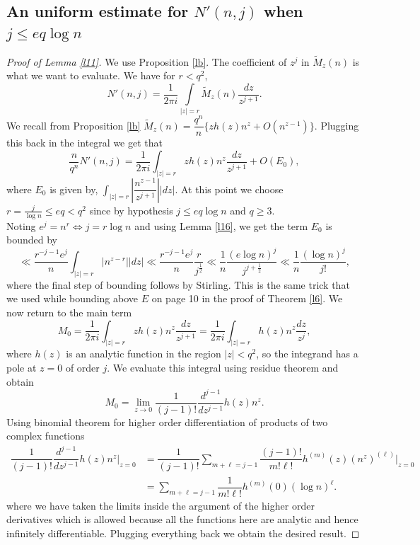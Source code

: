\documentclass[12pt]{amsart}
\numberwithin{equation}{section}
\theoremstyle{remark}
\theoremstyle{remark}
\theoremstyle{definition}
\begin{document}
\subsection{An uniform estimate for $N'(n,j)$ when $j\leqslant eq\log n$}\label{lj}
\s*
\begin{proof}[Proof of Lemma \ref{l11}]\label{X}
We use Proposition \ref{lb}. The coefficient of $z^j$ in $\widetilde{M}_z(n)$ is what we want to evaluate. We have for $r<q^2$,
$$N'(n,j)=\dfrac{1}{2\pi i}\displaystyle\int\limits_{|z|=r} \widetilde{M}_z(n) \dfrac{dz}{z^{j+1}}.$$
We recall from Proposition \ref{lb} $\widetilde{M}_z(n)=\dfrac{q^n}{n}\bigg \{ zh(z)n^z+O\left(n^{z-1}\right)\bigg \}.$
Plugging this back in the integral we get that
$$\dfrac{n}{q^n}N'(n,j)=\dfrac{1}{2\pi i}\displaystyle\int_{|z|=r}zh(z)n^z \dfrac{dz}{z^{j+1}}+O(E_0),$$
where $E_0$ is given by, $\displaystyle\int_{|z|=r} \left|\dfrac{n^{z-1}}{z^{j+1}}\right||dz|.$
At this point we choose $r=\frac{j}{\log n}\leqslant eq < q^2$ since by hypothesis $j\leqslant eq\log n$ and $q\geqslant 3$.\\
Noting $e^j=n^r\iff j=r\log n$ and using Lemma \ref{l16}, we get the term $E_0$ is bounded by
$$\ll \dfrac{r^{-j-1}e^j}{n}\displaystyle\int_{|z|=r} |n^{z-r}||dz|\ll \dfrac{r^{-j-1}e^j}{n}\dfrac{r}{j^{\frac{1}{2}}}\ll \dfrac{1}{n}\dfrac{(e\log n)^j}{j^{j+\frac{1}{2}}}\ll \dfrac{1}{n} \dfrac{(\log n)^j}{j!},$$
where the final step of bounding follows by Stirling.
This is the same trick that we used while bounding above $E$ on page 10 in the proof of Theorem \ref{l6}. 
We now return to the main term
$$M_0=\dfrac{1}{2\pi i}\displaystyle\int_{|z|=r}zh(z)n^z \dfrac{dz}{z^{j+1}}=\dfrac{1}{2\pi i}\displaystyle\int_{|z|=r}h(z)n^z \dfrac{dz}{z^j},$$
where $h(z)$ is an analytic function in the region $|z|<q^2$, so the integrand has a pole at $z=0$ of order $j$. We evaluate this integral using residue theorem and obtain
$$M_0=\lim\limits_{z\to 0}\dfrac{1}{(j-1)!}\dfrac{d^{j-1}}{dz^{j-1}} h(z)n^z.$$
Using binomial theorem for higher order differentiation of products of two complex functions
\begin{align}
\nonumber
\dfrac{1}{(j-1)!}\dfrac{d^{j-1}}{dz^{j-1}} h(z)n^z\Bigg|_{z=0} &=\dfrac{1}{(j-1)!}\displaystyle\sum\limits_{m+\ell=j-1}\dfrac{(j-1)!}{m!\ell!} h^{(m)}(z) (n^z)^{(\ell)}\Bigg|_{z=0}\\
\nonumber
&=\displaystyle\sum\limits_{m+\ell=j-1}\dfrac{1}{m!\ell!}h^{(m)}(0)(\log n)^\ell.
\end{align}
where we have taken the limits inside the argument of the higher order derivatives which is allowed because all the functions here are analytic and hence infinitely differentiable. Plugging everything back we obtain the desired result.
\end{proof}
\end{document}
